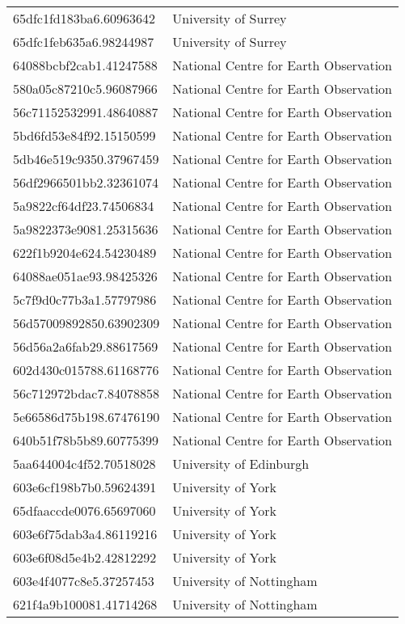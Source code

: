 \begin{tabular}{ll}
65dfc1fd183ba6.60963642 & University of Surrey \\
65dfc1feb635a6.98244987 & University of Surrey \\
64088bcbf2cab1.41247588 & National Centre for Earth Observation \\
580a05c87210c5.96087966 & National Centre for Earth Observation \\
56c71152532991.48640887 & National Centre for Earth Observation \\
5bd6fd53e84f92.15150599 & National Centre for Earth Observation \\
5db46e519c9350.37967459 & National Centre for Earth Observation \\
56df2966501bb2.32361074 & National Centre for Earth Observation \\
5a9822cf64df23.74506834 & National Centre for Earth Observation \\
5a9822373e9081.25315636 & National Centre for Earth Observation \\
622f1b9204e624.54230489 & National Centre for Earth Observation \\
64088ae051ae93.98425326 & National Centre for Earth Observation \\
5c7f9d0c77b3a1.57797986 & National Centre for Earth Observation \\
56d57009892850.63902309 & National Centre for Earth Observation \\
56d56a2a6fab29.88617569 & National Centre for Earth Observation \\
602d430c015788.61168776 & National Centre for Earth Observation \\
56c712972bdac7.84078858 & National Centre for Earth Observation \\
5e66586d75b198.67476190 & National Centre for Earth Observation \\
640b51f78b5b89.60775399 & National Centre for Earth Observation \\
5aa644004c4f52.70518028 & University of Edinburgh \\
603e6cf198b7b0.59624391 & University of York \\
65dfaaccde0076.65697060 & University of York \\
603e6f75dab3a4.86119216 & University of York \\
603e6f08d5e4b2.42812292 & University of York \\
603e4f4077c8e5.37257453 & University of Nottingham \\
621f4a9b100081.41714268 & University of Nottingham \\

\end{tabular}
